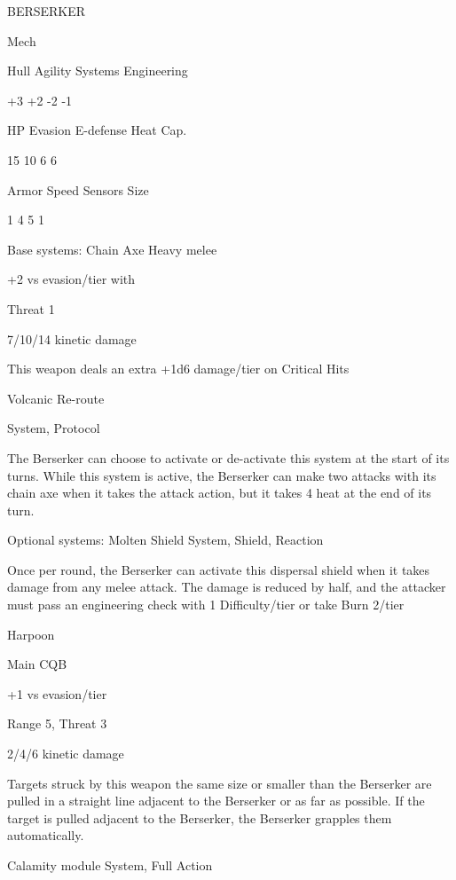        BERSERKER 

       Mech 

       Hull      Agility      Systems       Engineering 

       +3         +2          -2            -1 

       HP         Evasion     E-defense     Heat Cap. 

       15         10          6             6 

       Armor     Speed        Sensors       Size 

       1          4           5             1 

Base systems:  
Chain Axe  
Heavy melee
 
+2 vs evasion/tier with
 
Threat 1
 
7/10/14 kinetic damage
 
This weapon deals an extra +1d6 damage/tier on Critical Hits
 

Volcanic Re-route
 
System, Protocol
 
The Berserker can choose to activate or de-activate this system at the start of its turns. While  
this system is active, the Berserker can make two attacks with its chain axe when it takes the  
attack action, but it takes 4 heat at the end of its turn.
 

Optional systems:  
Molten Shield  
System, Shield, Reaction
 
Once per round, the Berserker can activate this dispersal shield when it takes damage from any  
melee attack. The damage is reduced by half, and the attacker must pass an engineering check  
with 1 Difficulty/tier or take Burn 2/tier
 

Harpoon 
 
Main CQB
 
+1 vs evasion/tier
 

                                                                                                         


Range 5, Threat 3
 
2/4/6 kinetic damage
 
Targets struck by this weapon the same size or smaller than the Berserker are pulled in a straight  
line adjacent to the Berserker or as far as possible. If the target is pulled adjacent to the  
Berserker, the Berserker grapples them automatically.
 

Calamity module  
System, Full Action
 
